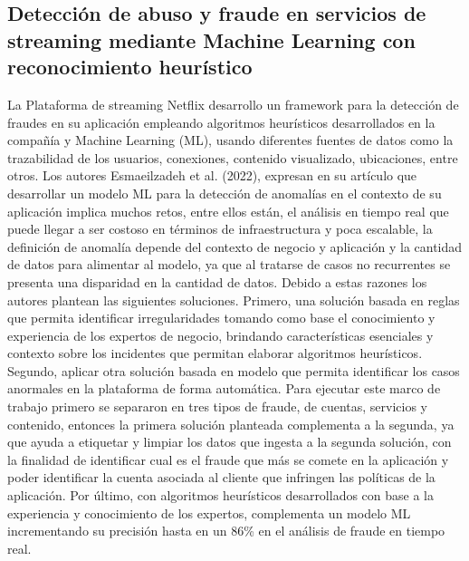 \documentclass[9pt,a4paper,twoside]{rho-class/rho}
\begin{document}
    \subsection{Detección de abuso y fraude en servicios de streaming mediante Machine Learning con reconocimiento heurístico}
    La Plataforma de streaming Netflix desarrollo un framework para la detección de fraudes en su aplicación empleando algoritmos heurísticos desarrollados en la compañía y Machine Learning (ML), usando diferentes fuentes de datos como la trazabilidad de los usuarios, conexiones, contenido visualizado, ubicaciones, entre otros. Los autores Esmaeilzadeh et al. (2022), expresan en su artículo que desarrollar un modelo ML para la detección de anomalías en el contexto de su aplicación implica muchos retos, entre ellos están, el análisis en tiempo real que puede llegar a ser costoso en términos de infraestructura y poca escalable, la definición de anomalía depende del contexto de negocio y aplicación y la cantidad de datos para alimentar al modelo, ya que al tratarse de casos no recurrentes se presenta una disparidad en la cantidad de datos. Debido a estas razones los autores plantean las siguientes soluciones. Primero, una solución basada en reglas que permita identificar irregularidades tomando como base el conocimiento y experiencia de los expertos de negocio, brindando características esenciales y contexto sobre los incidentes que permitan elaborar algoritmos heurísticos. Segundo, aplicar otra solución basada en modelo que permita identificar los casos anormales en la plataforma de forma automática. Para ejecutar este marco de trabajo primero se separaron en tres tipos de fraude, de cuentas, servicios y contenido, entonces la primera solución planteada complementa a la segunda, ya que ayuda a etiquetar y limpiar los datos que ingesta a la segunda solución, con la finalidad de identificar cual es el fraude que más se comete en la aplicación y poder identificar la cuenta asociada al cliente que infringen las políticas de la aplicación. Por último, con algoritmos heurísticos desarrollados con base a la experiencia y conocimiento de los expertos, complementa un modelo ML incrementando su precisión hasta en un 86\% en el análisis de fraude en tiempo real.
\end{document}
